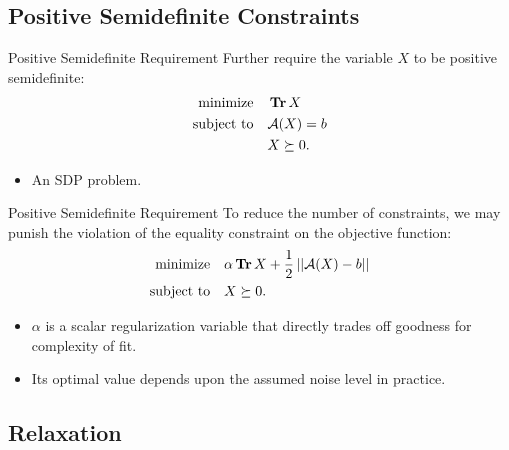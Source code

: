 \documentclass{beamer}
\begin{document}
\subsection{Positive Semidefinite Constraints}

\begin{frame}{Positive Semidefinite Requirement}
    Further require the variable \(X\) to be positive semidefinite:
    \[\begin{aligned}
        \textnormal{minimize}\quad & \operatorname{\mathbf{Tr}} X\\
        \textnormal{subject to}\quad & \mathcal A(X)=b\\
        & X\succeq 0.
    \end{aligned}\]
    \begin{itemize}
        \item An SDP problem.
    \end{itemize}
\end{frame}

\begin{frame}{Positive Semidefinite Requirement}
    To reduce the number of constraints, we may punish the violation of the equality constraint on the objective function:
    \[\begin{aligned}
        \textnormal{minimize}\quad & \alpha\operatorname{\mathbf{Tr}} X+\frac12\left|\left|\mathcal A(X)-b\right|\right|\\
        \textnormal{subject to}\quad & X\succeq 0.
    \end{aligned}\]
    \begin{itemize}
        \item \(\alpha\) is a scalar regularization variable that directly trades off goodness for complexity of fit.
        \item Its optimal value depends upon the assumed noise level in practice.
    \end{itemize}
\end{frame}

\subsection{Relaxation}

\begin{frame}
\end{frame}
\end{document}
